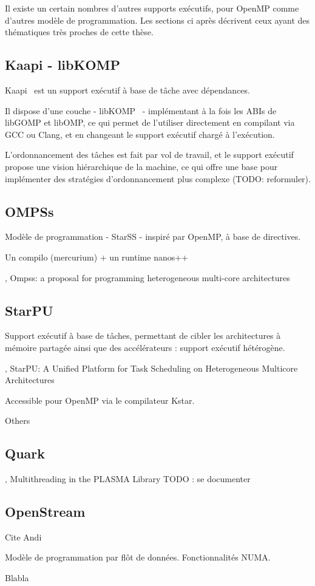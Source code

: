 Il existe un certain nombres d'autres supports exécutifs, pour OpenMP comme d'autres modèle de programmation.
Les sections ci après décrivent ceux ayant des thématiques très proches de cette thèse.

\subsection{Kaapi - libKOMP}

Kaapi~\cite{Gautier2007} est un support exécutif à base de tâche avec dépendances.

Il dispose d'une couche - libKOMP~\cite{Broquedis2012} - implémentant à la fois les ABIs de libGOMP et libOMP, ce qui permet de l'utiliser directement en compilant via GCC ou Clang, et en changeant le support exécutif chargé à l'exécution.

L'ordonnancement des tâches est fait par vol de travail, et le support exécutif propose une vision hiérarchique de la machine, ce qui offre une base pour implémenter des stratégies d'ordonnancement plus complexe (TODO: reformuler).


\subsection{OMPSs}\label{subsec:rw:ompss}

Modèle de programmation - StarSS - inspiré par OpenMP, à base de directives.

Un compilo (mercurium) + un runtime nanos++

\cite{OMPSs}, Ompss: a proposal for programming heterogeneous multi-core architectures

\subsection{StarPU}

Support exécutif à base de tâches, permettant de cibler les architectures à mémoire partagée ainsi que des accélérateurs : support exécutif hétérogène.

\cite{StarPU}, StarPU: A Unified Platform for Task Scheduling on Heterogeneous Multicore Architectures

Accessible pour OpenMP via le compilateur Kstar.

Others

\subsection{Quark}

\cite{Kurzak2013}, Multithreading in the PLASMA Library
TODO : se documenter

\subsection{OpenStream}

Cite Andi

Modèle de programmation par flôt de données.
Fonctionnalités NUMA.


Blabla
